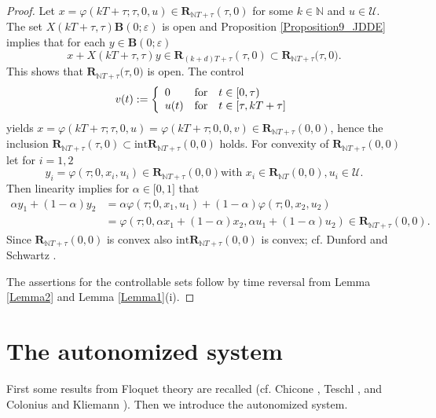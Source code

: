 \documentclass{siamltex}%
\begin{document}
\begin{proof}
Let $x=\varphi(kT+\tau;\tau,0,u)\in\mathbf{R}_{\mathbb{N}T+\tau}(\tau,0)$ for
some $k\in\mathbb{N}$ and $u\in\mathcal{U}$. The set $X(kT+\tau,\tau
)\mathbf{B}(0;\varepsilon)$ is open and Proposition \ref{Proposition9_JDDE}
implies that for each $y\in\mathbf{B}(0;\varepsilon)$%
\[
x+X(kT+\tau,\tau)y\in\mathbf{R}_{(k+d)T+\tau}(\tau,0)\subset\mathbf{R}%
_{\mathbb{N}T+\tau}\mathbf{(}\tau,0).
\]
This shows that $\mathbf{R}_{\mathbb{N}T+\tau}\mathbf{(}\tau,0)$ is open. The
control%
\[
v(t):=\left\{
\begin{array}
[c]{lll}%
0 & \text{for} & t\in\lbrack0,\tau)\\
u(t) & \text{for} & t\in\lbrack\tau,kT+\tau]
\end{array}
\right.
\]
yields $x=\varphi(kT+\tau;\tau,0,u)=\varphi(kT+\tau;0,0,v)\in\mathbf{R}%
_{\mathbb{N}T+\tau}(0,0)$, hence the inclusion $\mathbf{R}_{\mathbb{N}T+\tau
}(\tau,0)\subset\mathrm{int}\mathbf{R}_{\mathbb{N}T+\tau}(0,0)$ holds. For
convexity of $\mathbf{R}_{\mathbb{N}T+\tau}(0,0)$ let for $i=1,2$%
\[
y_{i}=\varphi(\tau;0,x_{i},u_{i})\in\mathbf{R}_{\mathbb{N}T+\tau}(0,0)\text{
with }x_{i}\in\mathbf{R}_{\mathbb{N}T}(0,0),u_{i}\in\mathcal{U}.
\]
Then linearity implies for $\alpha\in\lbrack0,1]$ that%
\begin{align*}
\alpha y_{1}+(1-\alpha)y_{2}  &  =\alpha\varphi(\tau;0,x_{1},u_{1}%
)+(1-\alpha)\varphi(\tau;0,x_{2},u_{2})\\
&  =\varphi(\tau;0,\alpha x_{1}+(1-\alpha)x_{2},\alpha u_{1}+(1-\alpha
)u_{2})\in\mathbf{R}_{\mathbb{N}T+\tau}(0,0).
\end{align*}
Since $\mathbf{R}_{\mathbb{N}T+\tau}(0,0)$ is convex also $\mathrm{int}%
\mathbf{R}_{\mathbb{N}T+\tau}(0,0)$ is convex; cf. Dunford and Schwartz
\cite[Theorem V.2.1]{DS}.

The assertions for the controllable sets follow by time reversal from Lemma
\ref{Lemma2} and Lemma \ref{Lemma1}(i).
\end{proof}

\section{The autonomized system\label{Section3}}

First some results from Floquet theory are recalled (cf. Chicone
\cite{Chic99}, Teschl \cite{Tes}, and Colonius and Kliemann \cite[Section
7.2]{ColK14}). Then we introduce the autonomized system.
\end{document}
